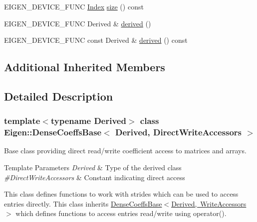\begin{DoxyCompactItemize}
\item 
E\+I\+G\+E\+N\+\_\+\+D\+E\+V\+I\+C\+E\+\_\+\+F\+U\+NC \mbox{\hyperlink{struct_eigen_1_1_eigen_base_a554f30542cc2316add4b1ea0a492ff02}{Index}} \mbox{\hyperlink{class_eigen_1_1_dense_coeffs_base_3_01_derived_00_01_direct_write_accessors_01_4_ac2c9348df3bb9c0044dbae6c278a8977}{size}} () const
\item 
E\+I\+G\+E\+N\+\_\+\+D\+E\+V\+I\+C\+E\+\_\+\+F\+U\+NC Derived \& \mbox{\hyperlink{class_eigen_1_1_dense_coeffs_base_3_01_derived_00_01_direct_write_accessors_01_4_a324b16961a11d2ecfd2d1b7dd7946545}{derived}} ()
\item 
E\+I\+G\+E\+N\+\_\+\+D\+E\+V\+I\+C\+E\+\_\+\+F\+U\+NC const Derived \& \mbox{\hyperlink{class_eigen_1_1_dense_coeffs_base_3_01_derived_00_01_direct_write_accessors_01_4_ad0cbee5e2dfef3bbe9db5e6d5fe12cc0}{derived}} () const
\end{DoxyCompactItemize}
\subsection*{Additional Inherited Members}


\subsection{Detailed Description}
\subsubsection*{template$<$typename Derived$>$\newline
class Eigen\+::\+Dense\+Coeffs\+Base$<$ Derived, Direct\+Write\+Accessors $>$}

Base class providing direct read/write coefficient access to matrices and arrays. 


\begin{DoxyTemplParams}{Template Parameters}
{\em Derived} & Type of the derived class \\
\hline
{\em \#\+Direct\+Write\+Accessors} & Constant indicating direct access\\
\hline
\end{DoxyTemplParams}
This class defines functions to work with strides which can be used to access entries directly. This class inherits \mbox{\hyperlink{class_eigen_1_1_dense_coeffs_base_3_01_derived_00_01_write_accessors_01_4}{Dense\+Coeffs\+Base$<$\+Derived, Write\+Accessors$>$}} which defines functions to access entries read/write using {\ttfamily operator()}.

